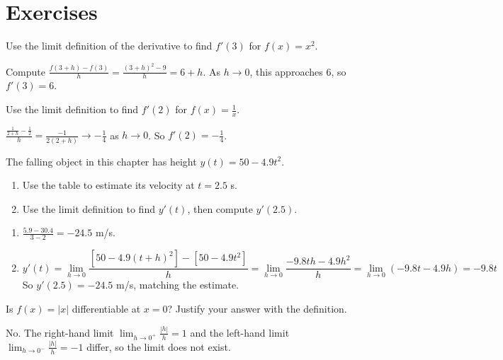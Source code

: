 \section{Exercises}

\begin{Exercise}[label=dfn1, title={Limit definition at a point}]
Use the limit definition of the derivative to find $f'(3)$ for $f(x) = x^2$.
\end{Exercise}
\begin{Answer}[ref=dfn1]
Compute $\frac{f(3+h) - f(3)}{h} = \frac{(3+h)^2 - 9}{h} = 6 + h$. As $h \to 0$, this approaches $6$, so $f'(3) = 6$.
\end{Answer}

\begin{Exercise}[label=dfn2, title={Limit definition for a reciprocal}]
Use the limit definition to find $f'(2)$ for $f(x) = \frac{1}{x}$.
\end{Exercise}
\begin{Answer}[ref=dfn2]
$\frac{\frac{1}{2+h} - \frac{1}{2}}{h} = \frac{-1}{2(2+h)} \to -\frac{1}{4}$ as $h \to 0$. So $f'(2) = -\frac{1}{4}$.
\end{Answer}

\begin{Exercise}[label=dfn_fall, title={The Falling Object}]
The falling object in this chapter has height $y(t) = 50 - 4.9t^2$.
\begin{enumerate}
\item Use the table to estimate its velocity at $t = 2.5$ s.
\item Use the limit definition to find $y'(t)$, then compute $y'(2.5)$.
\end{enumerate}
\end{Exercise}
\begin{Answer}[ref=dfn_fall]
\begin{enumerate}
\item $\frac{5.9 - 30.4}{3 - 2} = -24.5$ m/s.
\item
$$y'(t) = \lim_{h \to 0}\frac{\left[50 - 4.9(t+h)^2\right] - \left[50 - 4.9t^2\right]}{h}
= \lim_{h \to 0}\frac{-9.8th - 4.9h^2}{h} = \lim_{h \to 0}(-9.8t - 4.9h) = -9.8t$$
So $y'(2.5) = -24.5$ m/s, matching the estimate.
\end{enumerate}
\end{Answer}

\begin{Exercise}[label=dfn3, title={Differentiability at a corner}]
Is $f(x) = |x|$ differentiable at $x = 0$? Justify your answer with the definition.
\end{Exercise}
\begin{Answer}[ref=dfn3]
No. The right-hand limit $\lim_{h \to 0^+} \frac{|h|}{h} = 1$ and the left-hand limit $\lim_{h \to 0^-} \frac{|h|}{h} = -1$ differ, so the limit does not exist.
\end{Answer}
